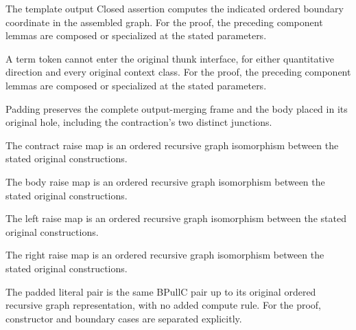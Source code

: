 The template output Closed assertion computes the indicated ordered boundary coordinate in the assembled graph.
For the proof, the preceding component lemmas are composed or specialized at the stated parameters.
\par{}

A term token cannot enter the original thunk interface, for either quantitative direction and every original context class.
For the proof, the preceding component lemmas are composed or specialized at the stated parameters.
\par{}

Padding preserves the complete output-merging frame and the body placed in its original hole, including the contraction's two distinct junctions.
\par{}

The contract raise map is an ordered recursive graph isomorphism between the stated original constructions.
\par{}

The body raise map is an ordered recursive graph isomorphism between the stated original constructions.
\par{}

The left raise map is an ordered recursive graph isomorphism between the stated original constructions.
\par{}

The right raise map is an ordered recursive graph isomorphism between the stated original constructions.
\par{}

The padded literal pair is the same BPullC pair up to its original ordered recursive graph representation, with no added compute rule.
For the proof, constructor and boundary cases are separated explicitly.
\par{}

